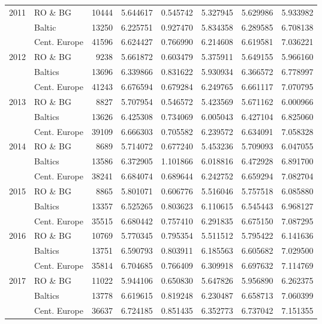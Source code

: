 \documentclass[11pt]{article}
\begin{document}
\begin{table}[!htbp]
{\begin{tabular}{llrrrrrr}
2011 & RO \& BG &  10444 &  5.644617 &  0.545742 &  5.327945 &  5.629986 &  5.933982 \\
     & Baltic &  13250 &  6.225751 &  0.927470 &  5.834358 &  6.289585 &  6.708138 \\
     & Cent. Europe &  41596 &  6.624427 &  0.766990 &  6.214608 &  6.619581 &  7.036221 \\
2012 & RO \& BG &   9238 &  5.661872 &  0.603479 &  5.375911 &  5.649155 &  5.966160 \\
     & Baltics &  13696 &  6.339866 &  0.831622 &  5.930934 &  6.366572 &  6.778997 \\
     & Cent. Europe &  41243 &  6.676594 &  0.679284 &  6.249765 &  6.661117 &  7.070795 \\
2013 & RO \& BG &   8827 &  5.707954 &  0.546572 &  5.423569 &  5.671162 &  6.000966 \\
     & Baltics &  13626 &  6.425308 &  0.734069 &  6.005043 &  6.427104 &  6.825060 \\
     & Cent. Europe &  39109 &  6.666303 &  0.705582 &  6.239572 &  6.634091 &  7.058328 \\
2014 & RO \& BG &   8689 &  5.714072 &  0.677240 &  5.453236 &  5.709093 &  6.047055 \\
     & Baltics &  13586 &  6.372905 &  1.101866 &  6.018816 &  6.472928 &  6.891700 \\
     & Cent. Europe &  38241 &  6.684074 &  0.689644 &  6.242752 &  6.659294 &  7.082704 \\
2015 & RO \& BG &   8865 &  5.801071 &  0.606776 &  5.516046 &  5.757518 &  6.085880 \\
     & Baltics &  13357 &  6.525265 &  0.803623 &  6.110615 &  6.545443 &  6.968127 \\
     & Cent. Europe &  35515 &  6.680442 &  0.757410 &  6.291835 &  6.675150 &  7.087295 \\
2016 & RO \& BG &  10769 &  5.770345 &  0.795354 &  5.511512 &  5.795422 &  6.141636 \\
     & Baltics &  13751 &  6.590793 &  0.803911 &  6.185563 &  6.605682 &  7.029500 \\
     & Cent. Europe &  35814 &  6.704685 &  0.766409 &  6.309918 &  6.697632 &  7.114769 \\
2017 & RO \& BG &  11022 &  5.944106 &  0.650830 &  5.647826 &  5.956890 &  6.262375 \\
     & Baltics &  13778 &  6.619615 &  0.819248 &  6.230487 &  6.658713 &  7.060399 \\
     & Cent. Europe &  36637 &  6.724185 &  0.851435 &  6.352773 &  6.737042 &  7.151355 \\

\end{tabular}}
\end{table}
\end{document}
